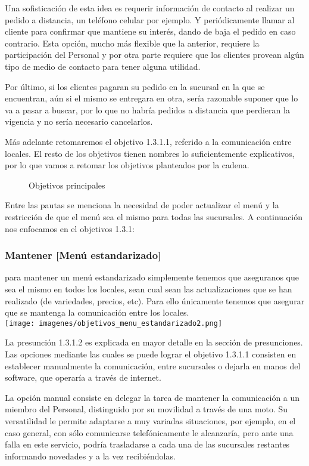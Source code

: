 \documentclass[a4paper,10pt]{article}
\begin{document}
Una sofisticación de esta idea es requerir información de contacto al realizar un pedido a distancia, un teléfono celular por ejemplo. Y periódicamente llamar al cliente para confirmar que mantiene su interés, dando de baja el pedido en caso contrario. Esta opción, mucho más flexible que la anterior, requiere la participación del Personal y por otra parte requiere que los clientes provean algún tipo de medio de contacto para tener alguna utilidad.

Por último, si los clientes pagaran su pedido en la sucursal en la que se encuentran, aún si el mismo se entregara en otra, sería razonable suponer que lo va a pasar a buscar, por lo que no habría pedidos a distancia que perdieran la vigencia y no sería necesario cancelarlos.

Más adelante retomaremos el objetivo 1.3.1.1, referido a la comunicación entre locales.
El resto de los objetivos tienen nombres lo suficientemente explicativos, por lo que vamos a retomar los objetivos planteados por la cadena.

\begin{figure}[H]
\centering
{}
\caption{Objetivos principales}
\end{figure}

Entre las pautas se menciona la necesidad de poder actualizar el menú y la restricción de que el menú sea el mismo para todas las sucursales. A continuación nos enfocamos en el objetivos 1.3.1:
\subsubsection*{Mantener [Menú estandarizado]}
para mantener un menú estandarizado simplemente tenemos que aseguranos que sea el mismo en todos los locales, sean cual sean las actualizaciones que se han realizado (de variedades, precios, etc). Para ello únicamente tenemos que asegurar que se mantenga la comunicación entre los locales. \\
\texttt{[image: imagenes/objetivos\_menu\_estandarizado2.png]}


La presunción 1.3.1.2 es explicada en mayor detalle en la sección de presunciones.
Las opciones mediante las cuales se puede lograr el objetivo 1.3.1.1 consisten en establecer manualmente la comunicación, entre sucursales o dejarla en manos del software, que operaría a través de internet. 

La opción manual consiste en delegar la tarea de mantener la comunicación a un miembro del Personal, distinguido por su movilidad a través de una moto. Su versatilidad le permite adaptarse a muy variadas situaciones, por ejemplo, en el caso general, con sólo comunicarse telefónicamente le alcanzaría, pero ante una falla en este servicio, podría trasladarse a cada una de las sucursales restantes informando novedades y a la vez recibiéndolas. 
\end{document}
